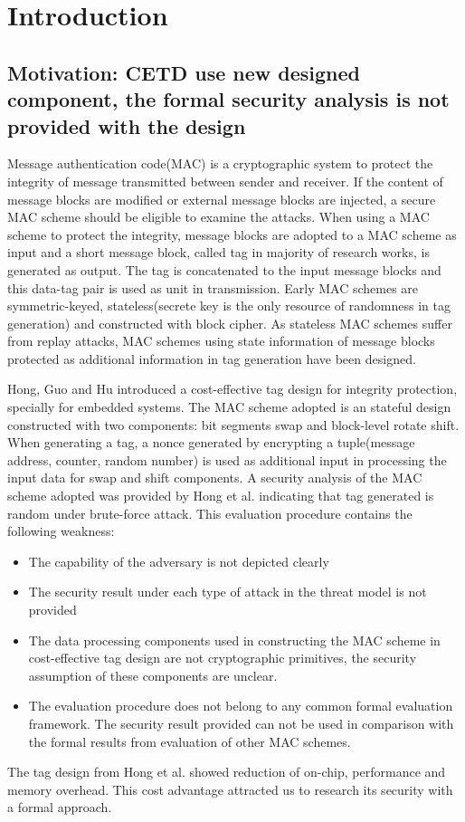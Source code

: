 \documentclass{article}
\begin{document}
\section{Introduction}
\subsection{Motivation: CETD use new designed component, the formal security
analysis is not provided with the design}
Message authentication code(MAC) is a cryptographic system to protect the integrity of message transmitted between sender and receiver. If the content of message blocks are modified or external message blocks are injected, a secure MAC scheme should be eligible to examine the attacks. When using a MAC scheme to protect the integrity, message blocks are adopted to a MAC scheme as input and a short message block, called tag in majority of research works, is generated as output. The tag is concatenated to the input message blocks and this data-tag pair is used as unit in transmission. Early MAC schemes are symmetric-keyed, stateless(secrete key is the only resource of randomness in tag generation) and constructed with block cipher. As stateless MAC schemes suffer from replay attacks, MAC schemes using state information of message blocks protected as additional information in tag generation have been designed.

Hong, Guo and Hu\cite{cetd} introduced a cost-effective tag design for integrity protection, specially for embedded systems. The MAC scheme adopted is an stateful design constructed with two components: bit segments swap and block-level rotate shift. When generating a tag, a nonce generated by encrypting a tuple(message address, counter, random number) is used as additional input in processing the input data for swap and shift components. 
A security analysis of the MAC scheme adopted was provided by Hong et al. indicating that tag generated is random under brute-force attack. This evaluation procedure contains the following weakness:
\begin{itemize}
	\item The capability of the adversary is not depicted clearly
	\item The security result under each type of attack in the threat model is not provided
	\item The data processing components used in constructing the MAC scheme in cost-effective tag design are not cryptographic primitives, the security assumption of these components are unclear.
	\item The evaluation procedure does not belong to any common formal evaluation framework. The security result provided can not be used in comparison with the formal results from evaluation of other MAC schemes.
\end{itemize}
The tag design from Hong et al. showed  reduction of on-chip, performance and memory overhead. This cost advantage attracted us to research its security with a formal approach.
\end{document}
